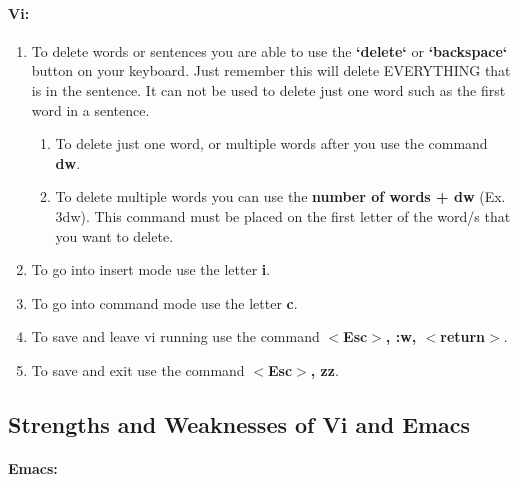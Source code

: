 \documentclass{article} %
\begin{document}
\noindent 

\noindent 
\paragraph{Vi:}

\noindent 

\begin{enumerate}
\item  To delete words or sentences you are able to use the \textbf{`delete`} or \textbf{`backspace`} button on your keyboard. Just remember this will delete EVERYTHING that is in the sentence. It can not be used to delete just one word such as the first word in a sentence.

\begin{enumerate}
\item  To delete just one word, or multiple words after you use the command \textbf{dw}. 

\item  To delete multiple words you can use the \textbf{number of words + dw} (Ex. 3dw). This command must be placed on the first letter of the word/s that you want to delete. 
\end{enumerate}

\item  To go into insert mode use the letter \textbf{i}.

\item  To go into command mode use the letter \textbf{c}.

\item  To save and leave vi running use the command\textbf{ $\boldsymbol{\mathrm{<}}$Esc$\boldsymbol{\mathrm{>}}$, :w, $\boldsymbol{\mathrm{<}}$return$\boldsymbol{\mathrm{>}}$}.

\item  To save and exit use the command\textbf{ $\boldsymbol{\mathrm{<}}$Esc$\boldsymbol{\mathrm{>}}$, zz}.
\end{enumerate}

\noindent 

\noindent 
\subsection{Strengths and Weaknesses of Vi and Emacs}

\noindent 

\noindent 
\paragraph{Emacs:}
\end{document}

